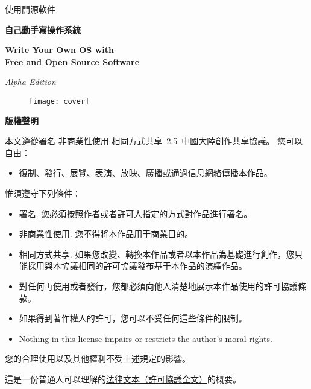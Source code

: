 \begin{center}
\Huge 使用開源軟件

\bf\fontsize{48}{52}\selectfont 自己動手寫操作系統

\bf\sc\Huge Write Your Own OS with\\ Free and Open Source Software

\it\LARGE Alpha Edition
\end{center}

\vskip 1cm
\begin{figure}[htbp]
 \centering
\texttt{[image: cover]}
\end{figure}

\noindent{}
\noindent{}
\clearpage

\begin{lined}{\textwidth}\vspace{2ex}
\begin{center}
\bf\Large 版權聲明
\end{center}
\vspace{2ex}
\end{lined}

\normalsize
本文遵從\href{http://creativecommons.org/licenses/by-nc-sa/2.5/cn/}{署名-非商業性使用-相同方式共享~2.5~中國大陸創作共享協議}。
\vskip 1cm
\noindent
\large 您可以自由：
\normalsize
\begin{itemize}
\item 復制、發行、展覽、表演、放映、廣播或通過信息網絡傳播本作品。
\end{itemize}

\noindent
\large 惟須遵守下列條件：
\normalsize
\begin{itemize}
\item{署名.} 您必須按照作者或者許可人指定的方式對作品進行署名。
\item{非商業性使用.} 您不得將本作品用于商業目的。
\item{相同方式共享.} 如果您改變、轉換本作品或者以本作品為基礎進行創作，您只能採用與本協議相同的許可協議發布基于本作品的演繹作品。
\item 對任何再使用或者發行，您都必須向他人清楚地展示本作品使用的許可協議條款。
\item 如果得到著作權人的許可，您可以不受任何這些條件的限制。
\item Nothing in this license impairs or restricts the author's moral rights.
\end{itemize}
\vskip 1cm
\normalsize
\begin{center}
您的合理使用以及其他權利不受上述規定的影響。

這是一份普通人可以理解的\href{http://creativecommons.org/licenses/by-nc-sa/2.5/cn/legalcode}{法律文本（許可協議全文）}的概要。 
\end{center}

